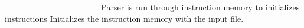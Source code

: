 ~\newline
~\newline
~\newline
~\newline
~\newline
~\newline
~\newline
~\newline
~\newline
~\newline
~\newline
~\newline
~\newline
~\newline
 \mbox{\hyperlink{class_parser}{Parser}} is run through instruction memory to initializes instructions Initializes the instruction memory with the input file. ~\newline
~\newline
~\newline
~\newline
~\newline
~\newline
~\newline
~\newline
~\newline
~\newline
~\newline
~\newline
~\newline
~\newline
~\newline
~\newline
~\newline
~\newline
~\newline
~\newline
~\newline
~\newline
~\newline
~\newline
~\newline
~\newline
~\newline
~\newline
~\newline
~\newline
~\newline
~\newline
~\newline
~\newline
~\newline
